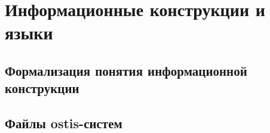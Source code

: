 \chapter{Информационные конструкции и языки}
\label{chapter_inf_constr}


\section{Формализация понятия информационной конструкции}
\section{Файлы ostis-систем}

%